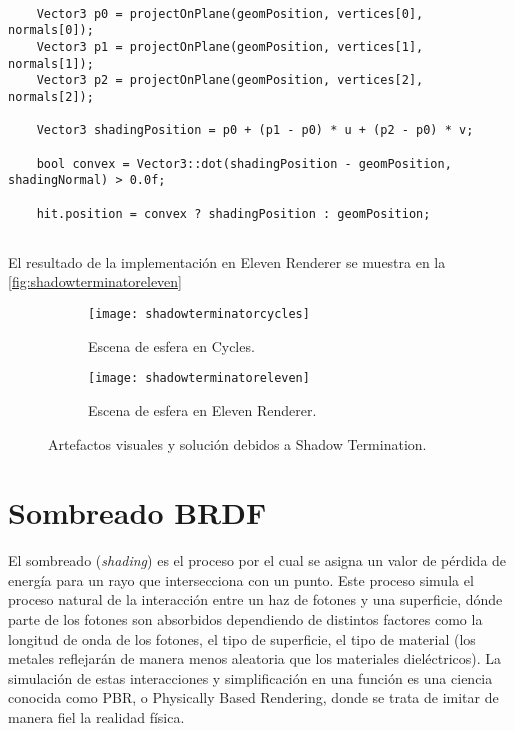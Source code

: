 \begin{minipage}[c]{0.95\textwidth}
\begin{lstlisting}[label={cod:shadowterminator}, caption={Código Shadow Terminator.}]
	
	Vector3 p0 = projectOnPlane(geomPosition, vertices[0], normals[0]);
    Vector3 p1 = projectOnPlane(geomPosition, vertices[1], normals[1]);
    Vector3 p2 = projectOnPlane(geomPosition, vertices[2], normals[2]);

    Vector3 shadingPosition = p0 + (p1 - p0) * u + (p2 - p0) * v;

    bool convex = Vector3::dot(shadingPosition - geomPosition, shadingNormal) > 0.0f;
	
	hit.position = convex ? shadingPosition : geomPosition;
	
\end{lstlisting}
\end{minipage}

El resultado de la implementación en Eleven Renderer se muestra en la \autoref{fig:shadowterminatoreleven}

\begin{figure}[H]
	\centering
	  \begin{subfigure}[b]{0.5\textwidth}
		\texttt{[image: shadowterminatorcycles]}
		\caption{Escena de esfera en Cycles.}
		\label{fig:shadowterminatorcycles}
	  \end{subfigure}
	 \hfill
	  \begin{subfigure}[b]{0.5\textwidth}
		\texttt{[image: shadowterminatoreleven]}
		\caption{Escena de esfera en Eleven Renderer.}
		\label{fig:shadowterminatoreleven}
	  \end{subfigure}
	  \caption{Artefactos visuales y solución debidos a Shadow Termination.}
      \label{fig:shadowterminator}
	 \hfill
\end{figure}
	
\section{Sombreado BRDF}
	
El sombreado (\emph{shading}) es el proceso por el cual se asigna un valor de pérdida de energía para un rayo que intersecciona con un punto. Este proceso simula el proceso natural de la interacción entre un haz de fotones y una superficie, dónde parte de los fotones son absorbidos dependiendo de distintos factores como la longitud de onda de los fotones, el tipo de superficie, el tipo de material (los metales reflejarán de manera menos aleatoria que los materiales dieléctricos). La simulación de estas interacciones y simplificación en una función es una ciencia conocida como PBR, o Physically Based Rendering, donde se trata de imitar de manera fiel la realidad física. 
		
